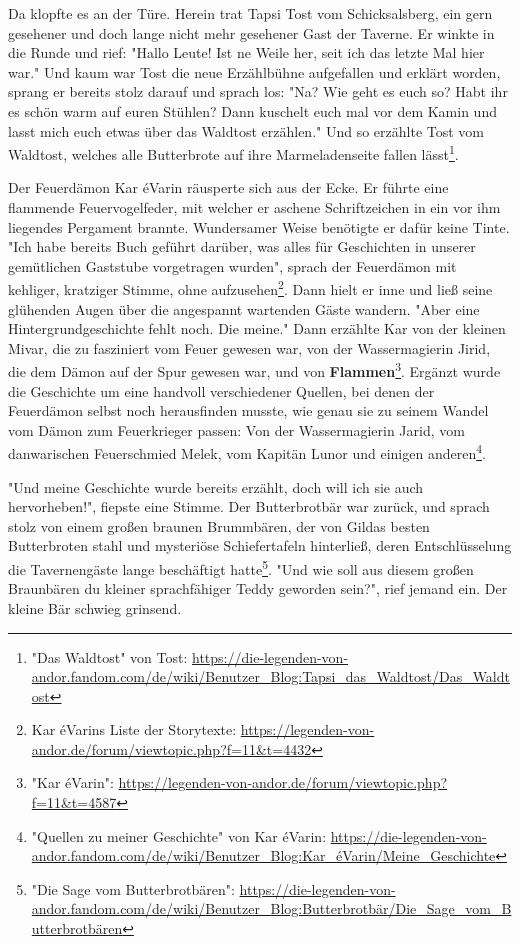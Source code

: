 Da klopfte es an der Türe. Herein trat Tapsi Tost vom Schicksalsberg, ein gern gesehener und doch lange nicht mehr gesehener Gast der Taverne. Er winkte in die Runde und rief: "Hallo Leute! Ist ne Weile her, seit ich das letzte Mal hier war." 
Und kaum war Tost die neue Erzählbühne aufgefallen und erklärt worden, sprang er bereits stolz darauf und sprach los: "Na? Wie geht es euch so? Habt ihr es schön warm auf euren Stühlen? Dann kuschelt euch mal vor dem Kamin und lasst mich euch etwas über das Waldtost erzählen."
Und so erzählte Tost vom Waldtost, welches alle Butterbrote auf ihre Marmeladenseite fallen lässt\footnote{"Das Waldtost" von Tost: \url{https://die-legenden-von-andor.fandom.com/de/wiki/Benutzer_Blog:Tapsi_das_Waldtost/Das_Waldtost}}. 

Der Feuerdämon Kar éVarin räusperte sich aus der Ecke. Er führte eine flammende Feuervogelfeder, mit welcher er aschene Schriftzeichen in ein vor ihm liegendes Pergament brannte. Wundersamer Weise benötigte er dafür keine Tinte.
"Ich habe bereits Buch geführt darüber, was alles für Geschichten in unserer gemütlichen Gaststube vorgetragen wurden", sprach der Feuerdämon mit kehliger, kratziger Stimme, ohne aufzusehen\footnote{Kar éVarins Liste der Storytexte: \url{https://legenden-von-andor.de/forum/viewtopic.php?f=11&t=4432}}. Dann hielt er inne und ließ seine glühenden Augen über die angespannt wartenden Gäste wandern. "Aber eine Hintergrundgeschichte fehlt noch. Die meine." Dann erzählte Kar von der kleinen Mivar, die zu fasziniert vom Feuer gewesen war, von der Wassermagierin Jirid, die dem Dämon auf der Spur gewesen war, und von \textbf{Flammen}\footnote{"Kar éVarin": \url{https://legenden-von-andor.de/forum/viewtopic.php?f=11&t=4587}}. Ergänzt wurde die Geschichte um eine handvoll verschiedener Quellen, bei denen der Feuerdämon selbst noch herausfinden musste, wie genau sie zu seinem Wandel vom Dämon zum Feuerkrieger passen: Von der Wassermagierin Jarid, vom danwarischen Feuerschmied Melek, vom Kapitän Lunor und einigen anderen\footnote{"Quellen zu meiner Geschichte" von Kar éVarin: \url{https://die-legenden-von-andor.fandom.com/de/wiki/Benutzer_Blog:Kar_éVarin/Meine_Geschichte}}.

"Und meine Geschichte wurde bereits erzählt, doch will ich sie auch hervorheben!", fiepste eine Stimme. Der Butterbrotbär war zurück, und sprach stolz von einem großen braunen Brummbären, der von Gildas besten Butterbroten stahl und mysteriöse Schiefertafeln hinterließ, deren Entschlüsselung die Tavernengäste lange beschäftigt hatte\footnote{"Die Sage vom Butterbrotbären": \url{https://die-legenden-von-andor.fandom.com/de/wiki/Benutzer_Blog:Butterbrotbär/Die_Sage_vom_Butterbrotbären}}. "Und wie soll aus diesem großen Braunbären du kleiner sprachfähiger Teddy geworden sein?", rief jemand ein. Der kleine Bär schwieg grinsend.

